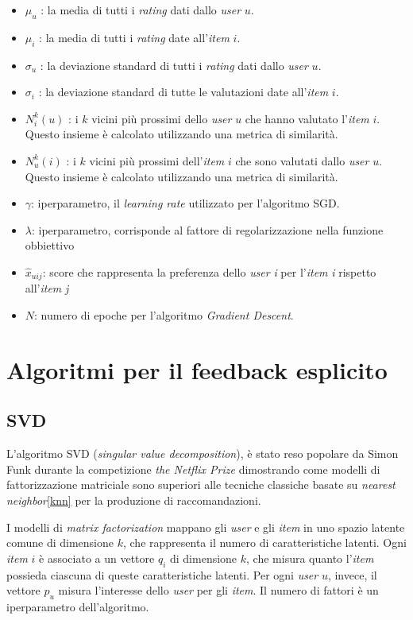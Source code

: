 \begin{itemize}
    \item $\mu_u$ : la media di tutti i \textit{rating} dati dallo \textit{user} $u$.
    \item $\mu_i$ : la media di tutti i \textit{rating} date all'\textit{item} $i$.
    \item $\sigma_u$ : la deviazione standard di tutti i \textit{rating} dati dallo \textit{user} $u$.
    \item $\sigma_i$ : la deviazione standard di tutte le valutazioni date all'\textit{item} $i$.
    \item $N_i^k(u)$ : i $k$ vicini più prossimi dello \textit{user} $u$ che hanno valutato l'\textit{item} $i$. Questo insieme è calcolato utilizzando una metrica di similarità.
    \item $N_u^k(i)$ : i $k$ vicini più prossimi dell'\textit{item} $i$ che sono valutati dallo \textit{user} $u$. Questo insieme è calcolato utilizzando una metrica di similarità.
    \item $\gamma$: iperparametro, il \textit{learning rate} utilizzato per l'algoritmo SGD.
    \item $\lambda$: iperparametro, corrisponde al fattore di regolarizzazione nella funzione obbiettivo
    \item $\hat{x}_{uij}$: score che rappresenta la preferenza dello \textit{user} \textit{i} per l'\textit{item} \textit{i} rispetto all'\textit{item} \textit{j}
    \item $N$: numero di epoche per l'algoritmo \textit{Gradient Descent}.
\end{itemize}

\section{Algoritmi per il feedback esplicito}\label{algoritmi-per-feedback-esplicito}

\subsection{SVD}\label{svd}

L'algoritmo SVD (\textit{singular value decomposition}), è stato reso popolare da Simon Funk durante la competizione \textit{the Netflix Prize} dimostrando come modelli di fattorizzazione matriciale sono superiori alle tecniche classiche basate su \textit{nearest neighbor}\ref{knn} per
la produzione di raccomandazioni.

I modelli di \textit{matrix factorization} mappano gli \textit{user} e gli \textit{item} in uno spazio latente comune di dimensione $k$, che rappresenta il numero di caratteristiche latenti. Ogni \textit{item} $i$ è associato a un vettore $q_i$ di dimensione $k$, che misura quanto l'\textit{item} possieda ciascuna di queste caratteristiche latenti. Per ogni \textit{user} $u$, invece, il vettore $p_u$ misura l'interesse dello \textit{user} per gli \textit{item}. Il numero di fattori è un iperparametro dell'algoritmo.

